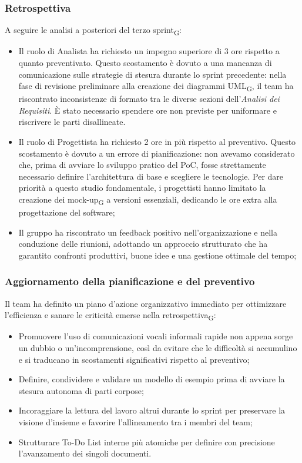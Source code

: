 \documentclass[a4paper, 10pt, colorlinks=true, linkcolor=black, urlcolor=blue, citecolor=blue, hidelinks]{article}
\begin{document}
\subsubsection{Retrospettiva}
A seguire le analisi a posteriori del terzo sprint\textsubscript{G}:
\begin{itemize}
    \item Il ruolo di Analista ha richiesto un impegno superiore di 3 ore rispetto a quanto preventivato. Questo scostamento è dovuto a una mancanza di comunicazione sulle strategie di stesura durante lo sprint precedente: nella fase di revisione preliminare alla creazione dei diagrammi UML\textsubscript{G}, il team ha riscontrato inconsistenze di formato tra le diverse sezioni dell'\textit{Analisi dei Requisiti}. È stato necessario spendere ore non previste per uniformare e riscrivere le parti disallineate.
    \item Il ruolo di Progettista ha richiesto 2 ore in più rispetto al preventivo. Questo scostamento è dovuto a un errore di pianificazione: non avevamo considerato che, prima di avviare lo sviluppo pratico del PoC, fosse strettamente necessario definire l'architettura di base e scegliere le tecnologie. Per dare priorità a questo studio fondamentale, i progettisti hanno limitato la creazione dei mock-up\textsubscript{G} a versioni essenziali, dedicando le ore extra alla progettazione del software;   
    \item Il gruppo ha riscontrato un feedback positivo nell'organizzazione e nella conduzione delle riunioni, adottando un approccio strutturato che ha garantito confronti produttivi, buone idee e una gestione ottimale del tempo;
\end{itemize}

\subsubsection{Aggiornamento della pianificazione e del preventivo}
Il team ha definito un piano d'azione organizzativo immediato per ottimizzare l'efficienza e sanare le criticità emerse nella retrospettiva\textsubscript{G}:
\begin{itemize}
    \item Promuovere l'uso di comunicazioni vocali informali rapide non appena sorge un dubbio o un'incomprensione, così da evitare che le difficoltà si accumulino e si traducano in scostamenti significativi rispetto al preventivo;
    \item Definire, condividere e validare un modello di esempio prima di avviare la stesura autonoma di parti corpose;
    \item Incoraggiare la lettura del lavoro altrui durante lo sprint per preservare la visione d'insieme e favorire l'allineamento tra i membri del team;
    \item Strutturare To-Do List interne più atomiche per definire con precisione l'avanzamento dei singoli documenti.
\end{itemize}
\end{document}
